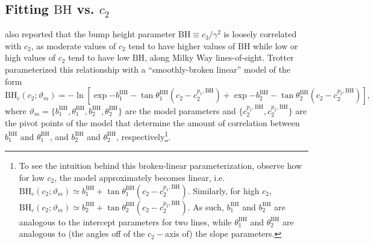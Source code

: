 \subsection{Fitting $\text{BH}$ vs. $c_2$}

\textcite{trotter} also reported that the bump height parameter $\text{BH}\equiv c_3/\gamma^2$ is loosely correlated with $c_2$, as moderate values of $c_2$ tend to have higher values of $\text{BH}$ while low or high values of $c_2$ tend to have low $\text{BH}$, along Milky Way lines-of-sight. Trotter parameterized this relationship with a ``smoothly-broken linear'' model of the form
\begin{equation}\label{eq:bhc2model}
    \text{BH}_{c}(c_2;\vartheta_m)=-\ln\left[\exp{{-b_1^{\text{BH}}-\tan\theta_1^{\text{BH}}\left(c_2-c_2^{p_1,\text{BH}}\right)}}+\exp{{-b_2^{\text{BH}}-\tan\theta_2^{\text{BH}}\left(c_2-c_2^{p_2,\text{BH}}\right)}}\right],
\end{equation}
where $\vartheta_m=\{b_1^{\text{BH}}, \theta_1^{\text{BH}}, b_2^{\text{BH}}, \theta_2^{\text{BH}}\}$ are the model parameters and $\{c_2^{p_1,\text{BH}}, c_2^{p_2,\text{BH}}\}$ are the pivot points of the model that determine the amount of correlation between $b_1^{\text{BH}}$ and $\theta_1^{\text{BH}}$, and $b_2^{\text{BH}}$ and $\theta_2^{\text{BH}}$, respectively\footnote{To see the intuition behind this broken-linear parameterization, observe how for low $c_2$, the model approximately becomes linear, i.e. $\text{BH}_{c}(c_2;\vartheta_m)\simeq b_1^{\text{BH}}+\tan\theta_1^{\text{BH}}\left(c_2-c_2^{p_1,\text{BH}}\right)$. Similarly, for high $c_2$, $\text{BH}_{c}(c_2;\vartheta_m)\simeq b_2^{\text{BH}}+\tan\theta_2^{\text{BH}}\left(c_2-c_2^{p_2,\text{BH}}\right)$. As such, $b_1^{\text{BH}}$ and $b_2^{\text{BH}}$ are analogous to the intercept parameters for two lines, while $\theta_1^{\text{BH}}$ and $\theta_2^{\text{BH}}$ are analogous to (the angles off of the $c_2-$axis of) the slope parameters.}. 

